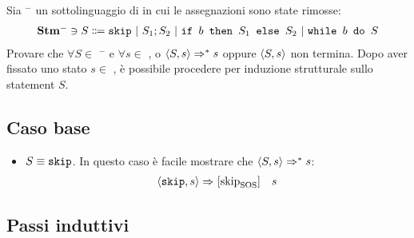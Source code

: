 \newcommand{\stmm}{\stm$^{-}$}

{Sia \stmm{} un sottolinguaggio di \stm{} in cui le assegnazioni sono state
rimosse:
\begin{align*}
\mbox{\stmm} \ni{} S \Coloneqq{}  \skipForFriends\ | \ 
                                  S_1; S_2\ | \ 
                                  \ifABC{b}{S_1}{S_2}\ | \ 
                                  \wbS{b}{S}
\end{align*}
Provare che $\forall{S} \in$ \stmm{} e $\forall{s} \in$ \states, o
$\langle{}S, s\rangle{} \Rightarrow^{*} s$ oppure $\langle{}S, s\rangle{}$ non termina.
}
{}
Dopo aver fissato uno stato $s \in$ \states, è possibile procedere per
induzione strutturale sullo statement $S$.

\subsection{Caso base}

\begin{itemize}
  \item $S \equiv{} \textrm{\normalfont{\texttt{skip}}}$. In questo caso è facile mostrare che
    $\langle{}S, s\rangle{} \Rightarrow^{*} s$:
\begin{align*}
\langle{}\textrm{\normalfont{\texttt{skip}}}, s\rangle{} \Rightarrow^{}  [ \textrm{\normalfont{skip}} ^ \textrm{\normalfont{}} _\textrm{\normalfont{SOS}} ] \ \ \ s
\end{align*}
\end{itemize}

\subsection{Passi induttivi}

